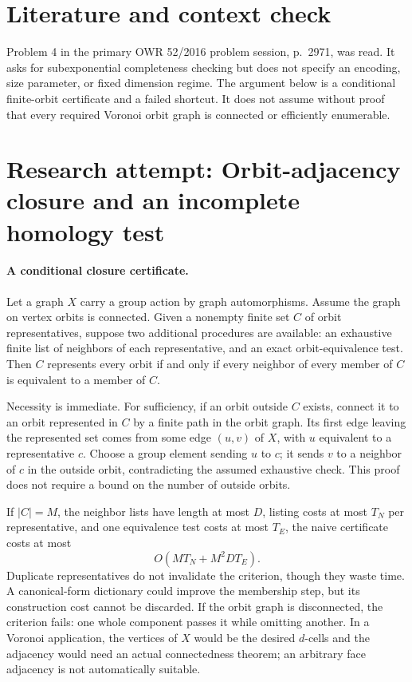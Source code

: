 \documentclass[11pt]{article}
\begin{document}
\section{Literature and context check}
Problem 4 in the primary OWR 52/2016 problem session, p.~2971, was read. It asks for subexponential completeness checking but does not specify an encoding, size parameter, or fixed dimension regime. The argument below is a conditional finite-orbit certificate and a failed shortcut. It does not assume without proof that every required Voronoi orbit graph is connected or efficiently enumerable.
\section{Research attempt: Orbit-adjacency closure and an incomplete homology test}

\paragraph{A conditional closure certificate.}
Let a graph $X$ carry a group action by graph automorphisms. Assume the graph on vertex orbits is connected. Given a nonempty finite set $C$ of orbit representatives, suppose two additional procedures are available: an exhaustive finite list of neighbors of each representative, and an exact orbit-equivalence test. Then $C$ represents every orbit if and only if every neighbor of every member of $C$ is equivalent to a member of $C$.

Necessity is immediate. For sufficiency, if an orbit outside $C$ exists, connect it to an orbit represented in $C$ by a finite path in the orbit graph. Its first edge leaving the represented set comes from some edge $(u,v)$ of $X$, with $u$ equivalent to a representative $c$. Choose a group element sending $u$ to $c$; it sends $v$ to a neighbor of $c$ in the outside orbit, contradicting the assumed exhaustive check. This proof does not require a bound on the number of outside orbits.

If $|C|=M$, the neighbor lists have length at most $D$, listing costs at most $T_N$ per representative, and one equivalence test costs at most $T_E$, the naive certificate costs at most
\[
 O(MT_N+M^2DT_E).
\]
Duplicate representatives do not invalidate the criterion, though they waste time. A canonical-form dictionary could improve the membership step, but its construction cost cannot be discarded. If the orbit graph is disconnected, the criterion fails: one whole component passes it while omitting another. In a Voronoi application, the vertices of $X$ would be the desired $d$-cells and the adjacency would need an actual connectedness theorem; an arbitrary face adjacency is not automatically suitable.
\end{document}
